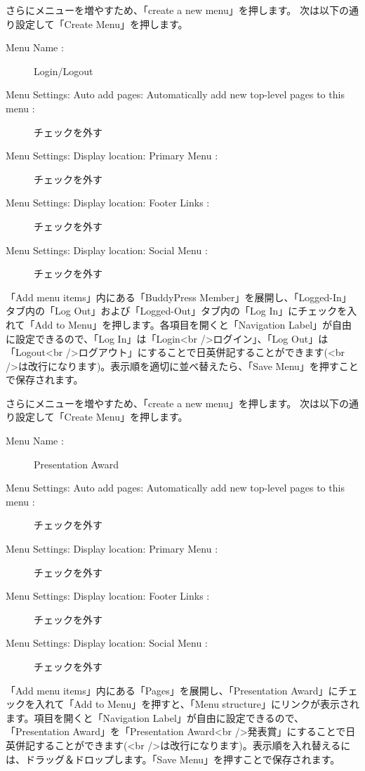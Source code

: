 \documentclass[titlepage,10pt,a4paper,uplatex]{jsbook}
\begin{document}
さらにメニューを増やすため、「create a new menu」を押します。
次は以下の通り設定して「Create Menu」を押します。

\begin{description}
\item[Menu Name : ] Login/Logout
\item[Menu Settings: Auto add pages: Automatically add new top-level pages to this menu : ] チェックを外す
\item[Menu Settings: Display location: Primary Menu : ] チェックを外す
\item[Menu Settings: Display location: Footer Links : ] チェックを外す
\item[Menu Settings: Display location: Social Menu : ] チェックを外す
\end{description}

「Add menu items」内にある「BuddyPress Member」を展開し、「Logged-In」タブ内の「Log Out」および「Logged-Out」タブ内の「Log In」にチェックを入れて「Add to Menu」を押します。各項目を開くと「Navigation Label」が自由に設定できるので、「Log In」は「Login{\textless}br /{\textgreater}ログイン」、「Log Out」は「Logout{\textless}br /{\textgreater}ログアウト」にすることで日英併記することができます({\textless}br /{\textgreater}は改行になります)。表示順を適切に並べ替えたら、「Save Menu」を押すことで保存されます。

さらにメニューを増やすため、「create a new menu」を押します。
次は以下の通り設定して「Create Menu」を押します。

\begin{description}
\item[Menu Name : ] Presentation Award
\item[Menu Settings: Auto add pages: Automatically add new top-level pages to this menu : ] チェックを外す
\item[Menu Settings: Display location: Primary Menu : ] チェックを外す
\item[Menu Settings: Display location: Footer Links : ] チェックを外す
\item[Menu Settings: Display location: Social Menu : ] チェックを外す
\end{description}

「Add menu items」内にある「Pages」を展開し、「Presentation Award」にチェックを入れて「Add to Menu」を押すと、「Menu structure」にリンクが表示されます。項目を開くと「Navigation Label」が自由に設定できるので、「Presentation Award」を「Presentation Award{\textless}br /{\textgreater}発表賞」にすることで日英併記することができます({\textless}br /{\textgreater}は改行になります)。表示順を入れ替えるには、ドラッグ＆ドロップします。「Save Menu」を押すことで保存されます。
\end{document}
